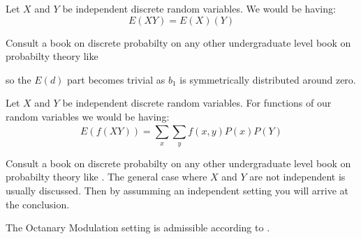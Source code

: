 \begin{Thm}
	Let $X$ and $Y$ be independent discrete random variables. We would be having:
	\begin{equation*}
		E(XY) = E(X)(Y)
	\end{equation*}
\end{Thm}
\begin{Proof}
Consult a book on discrete probabilty on any other undergraduate level book on probabilty theory like \cite{Chung2003}
\end{Proof}
		
  so the $E(d)$ part becomes trivial as $b_1$ is symmetrically distributed around zero. 

  \begin{Thm}
	Let $X$ and $Y$ be independent discrete random variables. For functions of our random variables we would be having:
	\begin{equation*}
		E(f(XY)) = \sum_{x}^{}\sum_{y}^{}f(x,y)P(x)P(Y)
	\end{equation*}
\end{Thm}
\begin{Proof}
	Consult a book on discrete probabilty on any other undergraduate level book on probabilty theory like \cite{DasGupta2011}.
	The general case where $X$ and $Y$ are not independent is usually discussed. Then by assumming an independent setting 
	you will arrive at the conclusion.
	\end{Proof}



\begin{Prop}
	The Octanary Modulation setting is admissible according to \cite{Candes2014}. 
	
\end{Prop}

